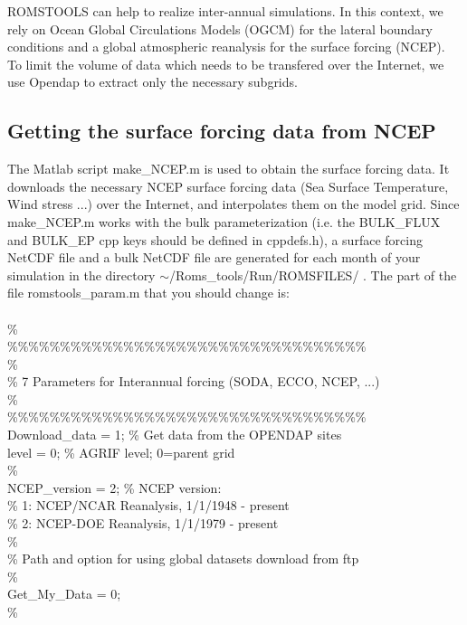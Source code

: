 
ROMSTOOLS can help to realize inter-annual simulations. In this context, 
we rely on Ocean Global Circulations Models (OGCM) for the lateral 
boundary conditions and a global atmospheric reanalysis for the surface 
forcing (NCEP). To limit the volume of data which needs to be transfered 
over the Internet, we use Opendap to extract only the necessary subgrids. 

\subsection{Getting the surface forcing data from NCEP}
The Matlab script make\_NCEP.m is used to obtain the surface forcing data.  It
downloads the necessary NCEP surface forcing data (Sea Surface Temperature, Wind
stress ...) over the Internet, and interpolates them on the model grid. Since
make\_NCEP.m works with the bulk parameterization (i.e. the BULK\_FLUX and BULK\_EP
cpp keys should be defined in cppdefs.h), a surface forcing NetCDF file and a bulk
NetCDF file are generated for each month of your simulation in the directory
$\sim$/Roms\_tools/Run/ROMSFILES/ .
The part of the file romstools\_param.m that you should change is:\\\\
\%\\
\%\%\%\%\%\%\%\%\%\%\%\%\%\%\%\%\%\%\%\%\%\%\%\%\%\%\%\%\%\%\%\%\%\%\\
\%\\
\% 7 Parameters for Interannual forcing (SODA, ECCO, NCEP, ...)\\
\%\\
\%\%\%\%\%\%\%\%\%\%\%\%\%\%\%\%\%\%\%\%\%\%\%\%\%\%\%\%\%\%\%\%\%\%\\
Download\_data = 1;             \% Get data from the OPENDAP sites   \\
level = 0;                               \% AGRIF level; 0=parent grid  \\
\%	 \\
NCEP\_version  = 2;                            \% NCEP version:  \\
\% 1: NCEP/NCAR Reanalysis, 1/1/1948 - present  \\
\% 2: NCEP-DOE Reanalysis, 1/1/1979 - present  \\
\%					       \\

\noindent \% Path and option for using global datasets download from ftp  \\
\%  \\
Get\_My\_Data = 0;   \\
\%  \\

